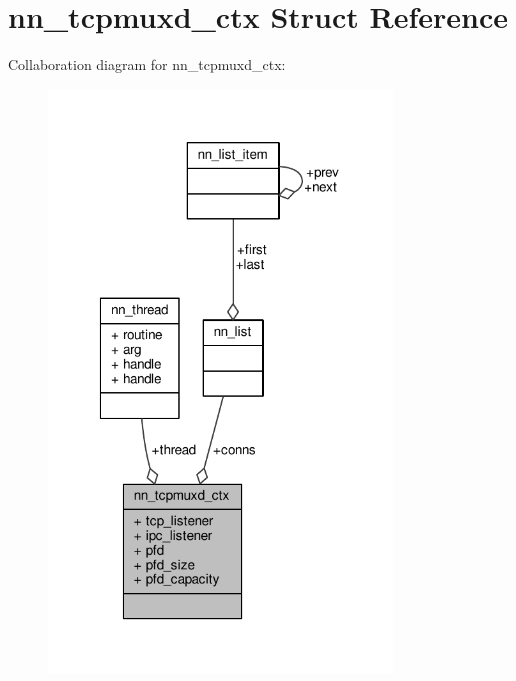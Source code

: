 \hypertarget{structnn__tcpmuxd__ctx}{}\section{nn\+\_\+tcpmuxd\+\_\+ctx Struct Reference}
\label{structnn__tcpmuxd__ctx}


Collaboration diagram for nn\+\_\+tcpmuxd\+\_\+ctx\+:\nopagebreak
\begin{figure}[H]
\begin{center}
\leavevmode
\includegraphics[width=259pt]{structnn__tcpmuxd__ctx__coll__graph}
\end{center}
\end{figure}
